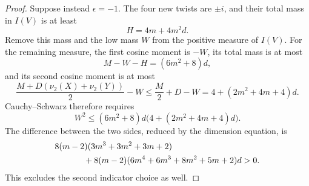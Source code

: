 \begin{proof}
Suppose instead $\epsilon=-1$. The four new twists are $\pm i$, and their total mass in $I(V)$ is at least
\[
H=4m+4m^2d.
\]
Remove this mass and the low mass $W$ from the positive measure of $I(V)$. For the remaining measure, the first cosine moment is $-W$, its total mass is at most
\[
M-W-H=(6m^2+8)d,
\]
and its second cosine moment is at most
\[
\frac{M+D(\nu_2(X)+\nu_2(Y))}{2}-W
\leq \frac M2+D-W=4+(2m^2+4m+4)d.
\]
Cauchy--Schwarz therefore requires
\[
W^2\leq (6m^2+8)d\bigl(4+(2m^2+4m+4)d\bigr).
\]
The difference between the two sides, reduced by the dimension equation, is
\begin{align*}
&8(m-2)(3m^3+3m^2+3m+2)\\
&\hspace{12mm}+8(m-2)(6m^4+6m^3+8m^2+5m+2)d>0.
\end{align*}
This excludes the second indicator choice as well.
\end{proof}
